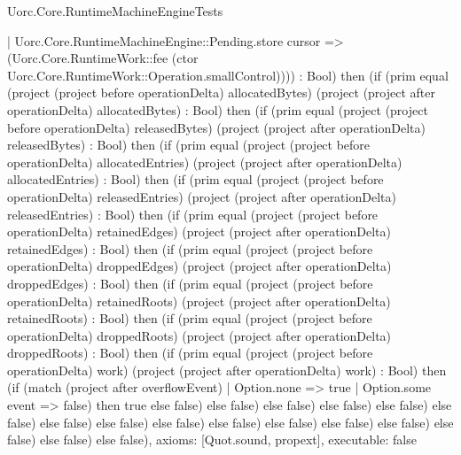 \begin{lexlean}{Uorc.Core.RuntimeMachineEngineTests}
\begin{semanticmodule}
{    | Uorc.Core.RuntimeMachineEngine::Pending.store cursor => (Uorc.Core.RuntimeWork::fee (ctor Uorc.Core.RuntimeWork::Operation.smallControl)))) : Bool) then (if (prim equal (project (project before operationDelta) allocatedBytes) (project (project after operationDelta) allocatedBytes) : Bool) then (if (prim equal (project (project before operationDelta) releasedBytes) (project (project after operationDelta) releasedBytes) : Bool) then (if (prim equal (project (project before operationDelta) allocatedEntries) (project (project after operationDelta) allocatedEntries) : Bool) then (if (prim equal (project (project before operationDelta) releasedEntries) (project (project after operationDelta) releasedEntries) : Bool) then (if (prim equal (project (project before operationDelta) retainedEdges) (project (project after operationDelta) retainedEdges) : Bool) then (if (prim equal (project (project before operationDelta) droppedEdges) (project (project after operationDelta) droppedEdges) : Bool) then (if (prim equal (project (project before operationDelta) retainedRoots) (project (project after operationDelta) retainedRoots) : Bool) then (if (prim equal (project (project before operationDelta) droppedRoots) (project (project after operationDelta) droppedRoots) : Bool) then (if (prim equal (project (project before operationDelta) work) (project (project after operationDelta) work) : Bool) then (if (match (project after overflowEvent)
    | Option.none => true
    | Option.some event => false) then true else false) else false) else false) else false) else false) else false) else false) else false) else false) else false) else false) else false) else false) else false) else false) else false),
  axioms: [Quot.sound, propext],
  executable: false
}


\end{semanticmodule}
\end{lexlean}
